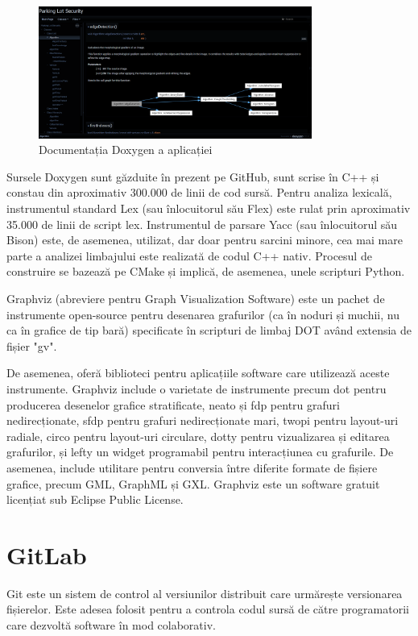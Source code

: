 \documentclass[a4paper,12pt]{report}
\begin{document}
\begin{figure}[h!]
    \centering
    \includegraphics[width=0.8\textwidth]{images/doxygen.jpg}
    \caption{Documentația Doxygen a aplicației}
\end{figure}
\FloatBarrier

Sursele Doxygen sunt găzduite în prezent pe GitHub, sunt scrise în C++ și constau din aproximativ 300.000 de linii de cod sursă. Pentru analiza lexicală, instrumentul standard Lex (sau înlocuitorul său Flex) este rulat prin aproximativ 35.000 de linii de script lex. Instrumentul de parsare Yacc (sau înlocuitorul său Bison) este, de asemenea, utilizat, dar doar pentru sarcini minore, cea mai mare parte a analizei limbajului este realizată de codul C++ nativ. Procesul de construire se bazează pe CMake și implică, de asemenea, unele scripturi Python.

Graphviz (abreviere pentru Graph Visualization Software) este un pachet de instrumente open-source pentru desenarea grafurilor (ca în noduri și muchii, nu ca în grafice de tip bară) specificate în scripturi de limbaj DOT având extensia de fișier "gv".

De asemenea, oferă biblioteci pentru aplicațiile software care utilizează aceste instrumente. Graphviz include o varietate de instrumente precum dot pentru producerea desenelor grafice stratificate, neato și fdp pentru grafuri nedirecționate, sfdp pentru grafuri nedirecționate mari, twopi pentru layout-uri radiale, circo pentru layout-uri circulare, dotty pentru vizualizarea și editarea grafurilor, și lefty un widget programabil pentru interacțiunea cu grafurile. De asemenea, include utilitare pentru conversia între diferite formate de fișiere grafice, precum GML, GraphML și GXL. Graphviz este un software gratuit licențiat sub Eclipse Public License.

\section{GitLab}
Git este un sistem de control al versiunilor distribuit care urmărește versionarea fișierelor. Este adesea folosit pentru a controla codul sursă de către programatorii care dezvoltă software în mod colaborativ.
\end{document}
